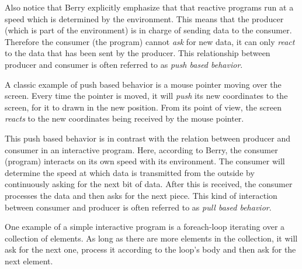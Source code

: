 Also notice that Berry explicitly emphasize that that reactive programs run at a speed which is determined by the environment. This means that the producer (which is part of the environment) is in charge of sending data to the consumer. Therefore the consumer (the program) cannot \emph{ask} for new data, it can only \emph{react} to the data that has been sent by the producer. This relationship between producer and consumer is often referred to as \textit{push based behavior}.

A classic example of push based behavior is a mouse pointer moving over the screen. Every time the pointer is moved, it will \emph{push} its new coordinates to the screen, for it to drawn in the new position. From its point of view, the screen \emph{reacts} to the new coordinates being received by the mouse pointer.

This push based behavior is in contrast with the relation between producer and consumer in an interactive program. Here, according to Berry, the consumer (program) interacts on its own speed with its environment. The consumer will determine the speed at which data is transmitted from the outside by continuously asking for the next bit of data. After this is received, the consumer processes the data and then asks for the next piece. This kind of interaction between consumer and producer is often referred to as \textit{pull based behavior}.

One example of a simple interactive program is a foreach-loop iterating over a collection of elements. As long as there are more elements in the collection, it will ask for the next one, process it according to the loop's body and then ask for the next element.